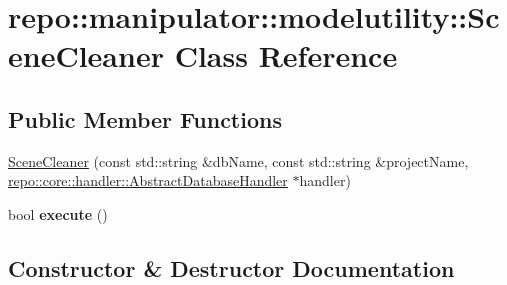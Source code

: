 \hypertarget{classrepo_1_1manipulator_1_1modelutility_1_1_scene_cleaner}{}\section{repo\+:\+:manipulator\+:\+:modelutility\+:\+:Scene\+Cleaner Class Reference}
\label{classrepo_1_1manipulator_1_1modelutility_1_1_scene_cleaner}
\subsection*{Public Member Functions}
\begin{DoxyCompactItemize}
\item 
\hyperlink{classrepo_1_1manipulator_1_1modelutility_1_1_scene_cleaner_aee9f7f982c38fdde0ce63788d6ac3e64}{Scene\+Cleaner} (const std\+::string \&db\+Name, const std\+::string \&project\+Name, \hyperlink{classrepo_1_1core_1_1handler_1_1_abstract_database_handler}{repo\+::core\+::handler\+::\+Abstract\+Database\+Handler} $\ast$handler)
\item 
\hypertarget{classrepo_1_1manipulator_1_1modelutility_1_1_scene_cleaner_acad499a9cdffb6f509e1cfb9e8194aff}{}bool {\bfseries execute} ()\label{classrepo_1_1manipulator_1_1modelutility_1_1_scene_cleaner_acad499a9cdffb6f509e1cfb9e8194aff}

\end{DoxyCompactItemize}


\subsection{Constructor \& Destructor Documentation}
\hypertarget{classrepo_1_1manipulator_1_1modelutility_1_1_scene_cleaner_aee9f7f982c38fdde0ce63788d6ac3e64}{}
